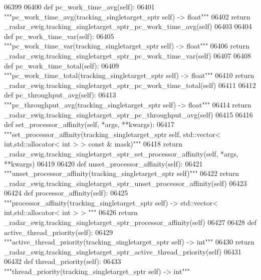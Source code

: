 \begin{DoxyCode}
{{{{{{{{{{{{{{{{{{{{{06399 
06400     \textcolor{keyword}{def }pc_work_time_avg(self):
06401         \textcolor{stringliteral}{"""pc\_work\_time\_avg(tracking\_singletarget\_sptr self) -> float"""}
06402         \textcolor{keywordflow}{return} \_radar\_swig.tracking\_singletarget\_sptr\_pc\_work\_time\_avg(self)
06403 
06404     \textcolor{keyword}{def }pc_work_time_var(self):
06405         \textcolor{stringliteral}{"""pc\_work\_time\_var(tracking\_singletarget\_sptr self) -> float"""}
06406         \textcolor{keywordflow}{return} \_radar\_swig.tracking\_singletarget\_sptr\_pc\_work\_time\_var(self)
06407 
06408     \textcolor{keyword}{def }pc_work_time_total(self):
06409         \textcolor{stringliteral}{"""pc\_work\_time\_total(tracking\_singletarget\_sptr self) -> float"""}
06410         \textcolor{keywordflow}{return} \_radar\_swig.tracking\_singletarget\_sptr\_pc\_work\_time\_total(self)
06411 
06412     \textcolor{keyword}{def }pc_throughput_avg(self):
06413         \textcolor{stringliteral}{"""pc\_throughput\_avg(tracking\_singletarget\_sptr self) -> float"""}
06414         \textcolor{keywordflow}{return} \_radar\_swig.tracking\_singletarget\_sptr\_pc\_throughput\_avg(self)
06415 
06416     \textcolor{keyword}{def }set_processor_affinity(self, *args, **kwargs):
06417         \textcolor{stringliteral}{"""set\_processor\_affinity(tracking\_singletarget\_sptr self, std::vector< int,std::allocator< int > >
       const & mask)"""}
06418         \textcolor{keywordflow}{return} \_radar\_swig.tracking\_singletarget\_sptr\_set\_processor\_affinity(self, *args, **kwargs)
06419 
06420     \textcolor{keyword}{def }unset_processor_affinity(self):
06421         \textcolor{stringliteral}{"""unset\_processor\_affinity(tracking\_singletarget\_sptr self)"""}
06422         \textcolor{keywordflow}{return} \_radar\_swig.tracking\_singletarget\_sptr\_unset\_processor\_affinity(self)
06423 
06424     \textcolor{keyword}{def }processor_affinity(self):
06425         \textcolor{stringliteral}{"""processor\_affinity(tracking\_singletarget\_sptr self) -> std::vector< int,std::allocator< int > >
      """}
06426         \textcolor{keywordflow}{return} \_radar\_swig.tracking\_singletarget\_sptr\_processor\_affinity(self)
06427 
06428     \textcolor{keyword}{def }active_thread_priority(self):
06429         \textcolor{stringliteral}{"""active\_thread\_priority(tracking\_singletarget\_sptr self) -> int"""}
06430         \textcolor{keywordflow}{return} \_radar\_swig.tracking\_singletarget\_sptr\_active\_thread\_priority(self)
06431 
06432     \textcolor{keyword}{def }thread_priority(self):
06433         \textcolor{stringliteral}{"""thread\_priority(tracking\_singletarget\_sptr self) -> int"""}
}}}}}}}}}}}}}}}}}}}}}
\end{DoxyCode}
